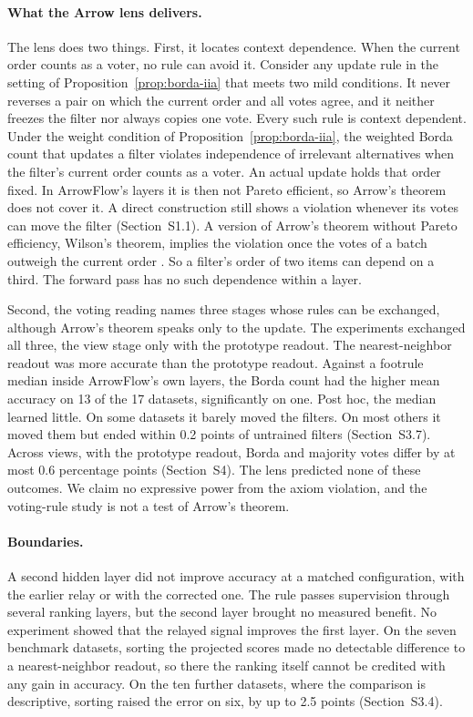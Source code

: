 \paragraph{What the Arrow lens delivers.}
The lens does two things. First, it locates context dependence. When the current order counts as a voter, no rule can avoid it. Consider any update rule in the setting of Proposition~\ref{prop:borda-iia} that meets two mild conditions. It never reverses a pair on which the current order and all votes agree, and it neither freezes the filter nor always copies one vote. Every such rule is context dependent. Under the weight condition of Proposition~\ref{prop:borda-iia}, the weighted Borda count that updates a filter violates independence of irrelevant alternatives when the filter's current order counts as a voter. An actual update holds that order fixed. In ArrowFlow's layers it is then not Pareto efficient, so Arrow's theorem does not cover it. A direct construction still shows a violation whenever its votes can move the filter (Section~S1.1). A version of Arrow's theorem without Pareto efficiency, Wilson's theorem, implies the violation once the votes of a batch outweigh the current order \citep{wilson1972pareto}. So a filter's order of two items can depend on a third. The forward pass has no such dependence within a layer.

Second, the voting reading names three stages whose rules can be exchanged, although Arrow's theorem speaks only to the update. The experiments exchanged all three, the view stage only with the prototype readout. The nearest-neighbor readout was more accurate than the prototype readout. Against a footrule median inside ArrowFlow's own layers, the Borda count had the higher mean accuracy on 13 of the 17 datasets, significantly on one. Post hoc, the median learned little. On some datasets it barely moved the filters. On most others it moved them but ended within 0.2 points of untrained filters (Section~S3.7). Across views, with the prototype readout, Borda and majority votes differ by at most $0.6$ percentage points (Section~S4). The lens predicted none of these outcomes. We claim no expressive power from the axiom violation, and the voting-rule study is not a test of Arrow's theorem.

\paragraph{Boundaries.}
A second hidden layer did not improve accuracy at a matched configuration, with the earlier relay or with the corrected one. The rule passes supervision through several ranking layers, but the second layer brought no measured benefit. No experiment showed that the relayed signal improves the first layer. On the seven benchmark datasets, sorting the projected scores made no detectable difference to a nearest-neighbor readout, so there the ranking itself cannot be credited with any gain in accuracy. On the ten further datasets, where the comparison is descriptive, sorting raised the error on six, by up to 2.5 points (Section~S3.4).

